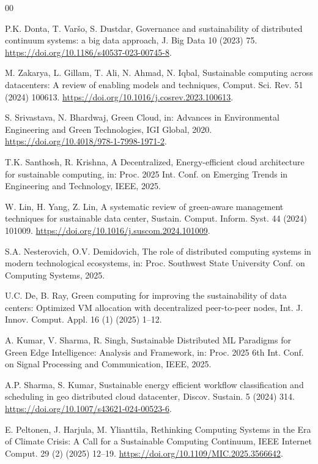 \documentclass[a4paper,fleqn]{cas-dc}
\begin{document}
\begin{thebibliography}{00}

P.K. Donta, T. Var\v{s}o, S. Dustdar, Governance and sustainability of distributed continuum systems: a big data approach, J. Big Data 10 (2023) 75. \url{https://doi.org/10.1186/s40537-023-00745-8}.

M. Zakarya, L. Gillam, T. Ali, N. Ahmad, N. Iqbal, Sustainable computing across datacenters: A review of enabling models and techniques, Comput. Sci. Rev. 51 (2024) 100613. \url{https://doi.org/10.1016/j.cosrev.2023.100613}.

S. Srivastava, N. Bhardwaj, Green Cloud, in: Advances in Environmental Engineering and Green Technologies, IGI Global, 2020. \url{https://doi.org/10.4018/978-1-7998-1971-2}.

T.K. Santhosh, R. Krishna, A Decentralized, Energy-efficient cloud architecture for sustainable computing, in: Proc. 2025 Int. Conf. on Emerging Trends in Engineering and Technology, IEEE, 2025.

W. Lin, H. Yang, Z. Lin, A systematic review of green-aware management techniques for sustainable data center, Sustain. Comput. Inform. Syst. 44 (2024) 101009. \url{https://doi.org/10.1016/j.suscom.2024.101009}.

S.A. Nesterovich, O.V. Demidovich, The role of distributed computing systems in modern technological ecosystems, in: Proc. Southwest State University Conf. on Computing Systems, 2025.

U.C. De, B. Ray, Green computing for improving the sustainability of data centers: Optimized VM allocation with decentralized peer-to-peer nodes, Int. J. Innov. Comput. Appl. 16 (1) (2025) 1--12.

A. Kumar, V. Sharma, R. Singh, Sustainable Distributed ML Paradigms for Green Edge Intelligence: Analysis and Framework, in: Proc. 2025 6th Int. Conf. on Signal Processing and Communication, IEEE, 2025.

A.P. Sharma, S. Kumar, Sustainable energy efficient workflow classification and scheduling in geo distributed cloud datacenter, Discov. Sustain. 5 (2024) 314. \url{https://doi.org/10.1007/s43621-024-00523-6}.

E. Peltonen, J. Harjula, M. Ylianttila, Rethinking Computing Systems in the Era of Climate Crisis: A Call for a Sustainable Computing Continuum, IEEE Internet Comput. 29 (2) (2025) 12--19. \url{https://doi.org/10.1109/MIC.2025.3566642}.


\end{thebibliography}
\end{document}
